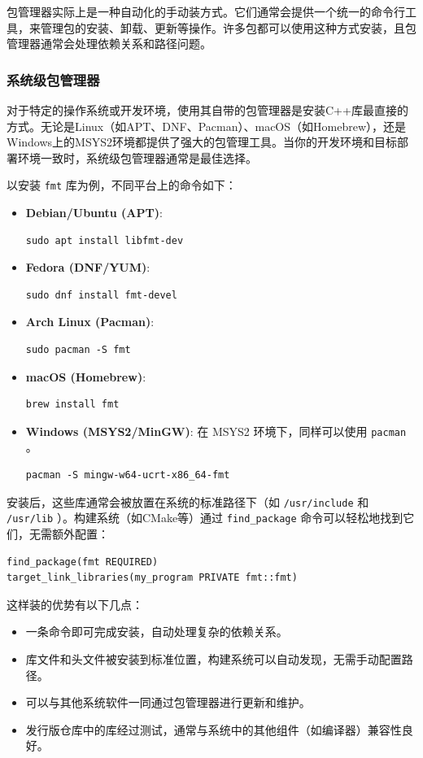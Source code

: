 包管理器实际上是一种自动化的手动装方式。它们通常会提供一个统一的命令行工具，来管理包的安装、卸载、更新等操作。许多包都可以使用这种方式安装，且包管理器通常会处理依赖关系和路径问题。

\subsubsection{系统级包管理器}

对于特定的操作系统或开发环境，使用其自带的包管理器是安装C++库最直接的方式。无论是Linux（如APT、DNF、Pacman）、macOS（如Homebrew），还是 Windows上的MSYS2环境都提供了强大的包管理工具。当你的开发环境和目标部署环境一致时，系统级包管理器通常是最佳选择。

以安装 \texttt{fmt} 库为例，不同平台上的命令如下：

\begin{itemize}
    \item \textbf{Debian/Ubuntu (APT)}:
    \begin{verbatim}
sudo apt install libfmt-dev
    \end{verbatim}
    \item \textbf{Fedora (DNF/YUM)}:
    \begin{verbatim}
sudo dnf install fmt-devel
    \end{verbatim}
    \item \textbf{Arch Linux (Pacman)}:
    \begin{verbatim}
sudo pacman -S fmt
    \end{verbatim}
    \item \textbf{macOS (Homebrew)}:
    \begin{verbatim}
brew install fmt
    \end{verbatim}
    \item \textbf{Windows (MSYS2/MinGW)}: 在 MSYS2 环境下，同样可以使用  \texttt{pacman} 。
    \begin{verbatim}
pacman -S mingw-w64-ucrt-x86_64-fmt
    \end{verbatim}
\end{itemize}

安装后，这些库通常会被放置在系统的标准路径下（如 \texttt{/usr/include} 和 \texttt{/usr/lib} ）。构建系统（如CMake等）通过 \texttt{find\_package} 命令可以轻松地找到它们，无需额外配置：
\begin{verbatim}
find_package(fmt REQUIRED)
target_link_libraries(my_program PRIVATE fmt::fmt)
\end{verbatim}

这样装的优势有以下几点：
\begin{itemize}
    \item 一条命令即可完成安装，自动处理复杂的依赖关系。
    \item 库文件和头文件被安装到标准位置，构建系统可以自动发现，无需手动配置路径。
    \item 可以与其他系统软件一同通过包管理器进行更新和维护。
    \item 发行版仓库中的库经过测试，通常与系统中的其他组件（如编译器）兼容性良好。
\end{itemize}

